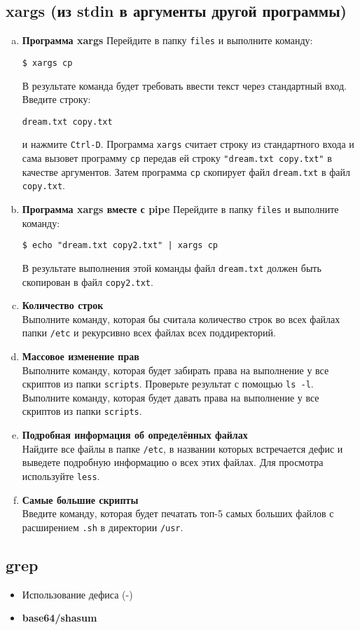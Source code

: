 \documentclass{article}
\begin{document}
\subsection{xargs (из stdin в аргументы другой программы)}
\begin{enumerate}[a.]
\item \textbf{Программа xargs}
Перейдите в папку \texttt{files} и выполните команду:
\begin{lstlisting}
$ xargs cp
\end{lstlisting}
В результате команда будет требовать ввести текст через стандартный вход. Введите строку:
\begin{lstlisting}
dream.txt copy.txt
\end{lstlisting}
и нажмите \texttt{Ctrl-D}. Программа \texttt{xargs} считает строку из стандартного входа и сама вызовет программу \texttt{cp} передав ей строку \texttt{"dream.txt copy.txt"} в качестве аргументов. Затем программа \texttt{cp} скопирует файл \texttt{dream.txt} в файл \texttt{copy.txt}.

\item \textbf{Программа xargs вместе с pipe}
Перейдите в папку \texttt{files} и выполните команду:
\begin{lstlisting}
$ echo "dream.txt copy2.txt" | xargs cp
\end{lstlisting}
В результате выполнения этой команды файл \texttt{dream.txt} должен быть скопирован в файл \texttt{copy2.txt}.

\item \textbf{Количество строк}\\
Выполните команду, которая бы считала количество строк во всех файлах папки \texttt{/etc} и рекурсивно всех файлах всех поддиректорий.

\item \textbf{Массовое изменение прав}\\
Выполните команду, которая будет забирать права на выполнение у все скриптов из папки \texttt{scripts}. Проверьте результат с помощью \texttt{ls -l}. Выполните команду, которая будет давать права на выполнение у все скриптов из папки \texttt{scripts}.

\item \textbf{Подробная информация об определённых файлах}\\
Найдите все файлы в папке \texttt{/etc}, в названии которых встречается дефис и выведете подробную информацию о всех этих файлах. Для просмотра используйте \texttt{less}.

\item \textbf{Самые большие скрипты}\\
Введите команду, которая будет печатать топ-5 самых больших файлов с расширением \texttt{.sh} в директории \texttt{/usr}.
\end{enumerate}
\subsection{grep}


\newpage
\begin{itemize}
\item  Использование дефиса (-)
\item \textbf{base64/shasum}
\end{itemize}
\end{document}
